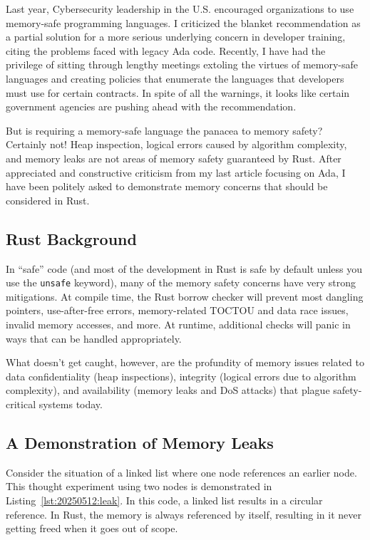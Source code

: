 Last year, Cybersecurity leadership in the U.S. encouraged organizations to use memory-safe programming languages. I criticized the blanket recommendation\autocite{20250512:hood2} as a partial solution for a more serious underlying concern in developer training, citing the problems faced with legacy Ada code\autocite{20250512:hood}. Recently, I have had the privilege of sitting through lengthy meetings extoling the virtues of memory-safe languages and creating policies that enumerate the languages that developers must use for certain contracts. In spite of all the warnings, it looks like certain government agencies are pushing ahead with the recommendation.

But is requiring a memory-safe language the panacea to memory safety? Certainly not! Heap inspection, logical errors caused by algorithm complexity, and memory leaks are not areas of memory safety guaranteed by Rust. After appreciated and constructive criticism from my last article focusing on Ada, I have been politely asked to demonstrate memory concerns that should be considered in Rust.

\subsection*{Rust Background}
In ``safe'' code (and most of the development in Rust is safe by default unless you use the \texttt{unsafe} keyword), many of the memory safety concerns have very strong mitigations. At compile time, the Rust borrow checker will prevent most dangling pointers, use-after-free errors, memory-related TOCTOU and data race issues, invalid memory accesses, and more. At runtime, additional checks will panic in ways that can be handled appropriately.

What doesn't get caught, however, are the profundity of memory issues related to data confidentiality (heap inspections), integrity (logical errors due to algorithm complexity), and availability (memory leaks and DoS attacks) that plague safety-critical systems today.

\subsection*{A Demonstration of Memory Leaks}

Consider the situation of a linked list where one node references an earlier node. This thought experiment using two nodes is demonstrated in Listing~\ref{lst:20250512:leak}. In this code, a linked list results in a circular reference. In Rust, the memory is always referenced by itself, resulting in it never getting freed when it goes out of scope.

